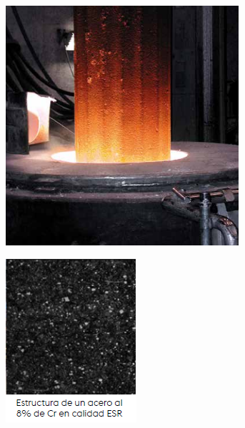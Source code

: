 \documentclass[12pt,a4paper]{article}
\begin{document}
\begin{figure}[H]
    \centering
    \begin{subfigure}{0.45\textwidth}
        \centering
        \includegraphics[width=\textwidth]{Inagenes para latex/8 izq.png}
    \end{subfigure}
    \begin{subfigure}{0.45\textwidth}
        \centering
        \includegraphics[width=\textwidth]{Inagenes para latex/8 der.png}
    \end{subfigure}
\end{figure}
\end{document}
